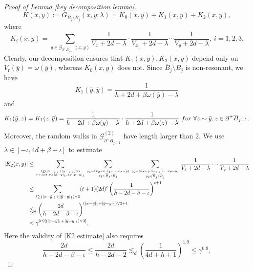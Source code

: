\documentclass[10pt,a4paper]{amsart}
\newcommand{\barB}{\overline{B}}
\newcommand{\mcG}{\mathcal{G}}
\begin{document}
\begin{proof}[Proof of Lemma \ref{key decomposition lemma}]
\begin{equation}\label{decomposition of K}
  K(x,y):= G_{\barB_{j}\setminus B_j}(x,y;\lambda) =K_0(x,y)+K_1(x,y)+K_2(x,y),
\end{equation}
where 
\begin{equation}\label{Ki comes from graph decomposition}
  K_i(x,y)= \sum_{g\in \mcG_{\partial^+ \barB_{j-1}}(x,y)}  \frac{1}{V_{x}+2d-\lambda}\cdot \frac{1}{V_{x_1}+2d-\lambda}\cdots \frac{1}{V_{y}+2d-\lambda}, \ i=1,2,3 .
\end{equation}
Clearly, our decomposition ensures that $K_1(x,y),K_2(x,y)$ depend only  on $V_{\text{r}}(\bar{y})=\omega(\bar{y})$, whereas $K_0(x,y)$ does not. Since $\barB_{j}\setminus B_j$ is non-resonant, we have 
\begin{equation}\label{K1 formula 1}
  K_1(\bar{y},\bar{y})= \frac{1}{h+2d+\beta \omega(\bar{y})-\lambda} 
\end{equation}
and
\begin{equation}\label{K1 formula 2}
  K_1(\bar{y},z)=K_1(z,\bar{y})=\frac{1}{h+2d+\beta \omega(\bar{y})-\lambda} \cdot \frac{1}{h+2d+\beta \omega(z)-\lambda} \ {\rm for}\ \forall z\sim \bar{y},z\in \partial^+\barB_{j-1}.
\end{equation} 
Moreover, the random walks in $\mcG_{\partial^+ \barB_{j-1}}^{(2)}$ have length larger than $2$.
We use $\lambda\in [-\iota,4d+\beta+\iota]$ to estimate
\begin{align}\label{K2 estimate}
\notag  |K_2(x,y)| & \leq \sum_{t \geq (|x-\bar{y}|_1+|\bar{y}-y|_1)\vee 2 \atop r+s=t,r>|x-\bar{y}|_1,s>|\bar{y}-y|_1} \sum_{ g_1 =(x_0=x, x_1,\cdots,x_r=\bar{y}) \atop g_1\in \barB_j\setminus B_j} \sum_{ g_2 =(x_r=\bar{y}, x_{r+1},\cdots,x_r=\bar{y}) \atop g_2\in \barB_j\setminus B_j} \frac{1}{V_{x}+2d-\lambda}\cdots \frac{1}{V_{y}+2d-\lambda}  \\
 \notag  &\leq \sum_{t \geq (|x-\bar{y}|_1+|\bar{y}-y|_1)\vee 2 } (t+1) (2d)^t \left(\frac{1}{h-2d-\beta-\iota}\right)^{t+1} \\
\notag & \lesssim_d \left(\frac{2d}{h-2d-\beta-\iota}\right)^{(|x-\bar{y}|_1+|\bar{y}-y|_1)\vee 2 +1}\\
      &<\gamma^{0.9[(|x-\bar{y}|_1+|\bar{y}-y|_1)\vee 3]}.
\end{align}
Here the validity of \eqref{K2 estimate} also requires 
\begin{equation}\label{essential barrier high 3}
   \frac{2d}{h-2d-\beta-\iota}\leq \frac{2d}{h-2d-2}\lesssim_d   \left(\frac{1}{4d+h+1}\right) ^{1.9} \leq  \gamma^{0.9},
\end{equation}

\end{proof}
\end{document}
